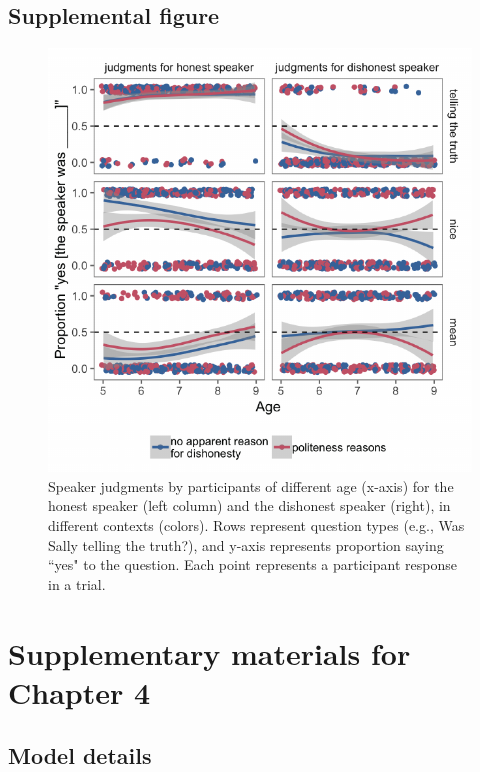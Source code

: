 \documentclass[oneside]{report}
\begin{document}
\section{Supplemental figure}\label{supplemental-figure}
\begin{figure}[p]

{\centering \includegraphics[width=0.9\linewidth]{erica_yoon_dissertation_files/figure-latex/figTrupolAppendix-1} 

}

\caption[Speaker ratings for the experiment in Chapter 4 with age as a continuous variable.]{Speaker judgments by participants of different age (x-axis) for the honest speaker (left column) and the dishonest speaker (right), in different contexts (colors). Rows represent question types (e.g., Was Sally telling the truth?), and y-axis represents proportion saying ``yes" to the question. Each point represents a participant response in a trial.}\label{fig:figTrupolAppendix}
\end{figure}
\chapter{Supplementary materials for Chapter
4}\label{supplementary-materials-for-chapter-4}

\section{Model details}\label{model-details}
\end{document}
